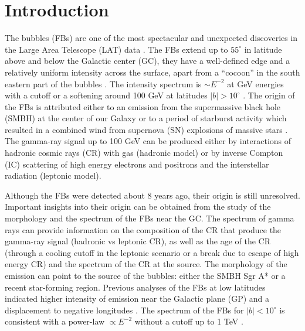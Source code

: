 \section{Introduction}



The \Fermi bubbles (FBs) are one of the most spectacular and unexpected discoveries 
in the \Fermi Large Area Telescope (LAT) data \citep{2010ApJ...724.1044S}.
The FBs extend up to $55^\circ$ in latitude above and below the Galactic center (GC),
they have a well-defined edge and a relatively uniform intensity across the surface, apart from a ``cocoon'' in the south eastern part of the bubbles
\citep{2012ApJ...753...61S, 2014ApJ...793...64A}.
The intensity spectrum is $\sim E^{-2}$ at GeV energies with a cutoff or a softening around 100 GeV at latitudes $|b| > 10^\circ$ \citep{2014ApJ...793...64A}.
The origin of the FBs is attributed either to an emission from the supermassive black hole (SMBH) at
the center of our Galaxy %
or to a period of starburst activity which resulted in a combined wind
from supernova (SN) explosions of massive stars %
\citep{2010ApJ...724.1044S}.
The gamma-ray signal up to 100 GeV can be produced either by interactions of hadronic cosmic rays (CR) with gas (hadronic model)
or by inverse Compton (IC) scattering of high energy electrons and positrons and the interstellar radiation (leptonic model).

Although the FBs were detected about 8 years ago, their origin is still unresolved.
Important insights into their origin can be obtained from the study of the morphology and the spectrum of the FBs near the GC.
The spectrum of gamma rays can provide information on the composition of the 
CR that produce the gamma-ray signal (hadronic vs leptonic CR),
as well as the age of the CR (through a cooling cutoff in the leptonic scenario or a break due to escape of high energy CR)
and the spectrum of the CR at the source.
The morphology of the emission can point to the source of the bubbles: either the SMBH Sgr A* or a recent star-forming region.
Previous analyses of the FBs at low latitudes indicated higher intensity of emission near the Galactic plane (GP) and a displacement
to negative longitudes \citep{2016ApJS..223...26A, 2017ApJ...840...43A, 2017JCAP...08..022S}.
The spectrum of the FBs for $|b| < 10^\circ$ is consistent with a power-law $\propto E^{-2}$ 
without a cutoff up to 1 TeV \citep{2017ApJ...840...43A}.

